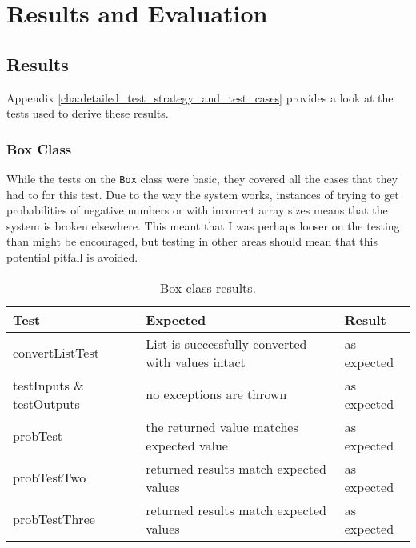 \documentclass[report.tex]{subfiles}
\begin{document}
\chapter{Results and Evaluation} %
\label{cha:results_and_evaluation}

\section{Results} %
\label{sec:results}
Appendix \ref{cha:detailed_test_strategy_and_test_cases} provides a look at the
tests used to derive these results.

\subsection{Box Class} %
\label{sub:box_class_res}
While the tests on the \texttt{Box} class were basic, they covered all the cases
that they had to for this test. Due to the way the system works, instances of
trying to get probabilities of negative numbers or with incorrect array sizes
means that the system is broken elsewhere. This meant that I was perhaps looser
on the testing than might be encouraged, but testing in other areas should mean
that this potential pitfall is avoided.

\begin{table}[H]
    \centering
    \begin{tabular}{l | p{6cm} | l}
    Test & Expected & Result \\    
    \hline
    convertListTest & List is successfully converted with values intact
    & as expected \\
    testInputs \& testOutputs & no exceptions are thrown & as expected \\
    probTest & the returned value matches expected value & as expected \\
    probTestTwo & returned results match expected values & as expected \\
    probTestThree & returned results match expected values
    & as expected \\
    \end{tabular}
    \caption{Box class results.}
  \label{tab:box_result}
\end{table}
\end{document}
